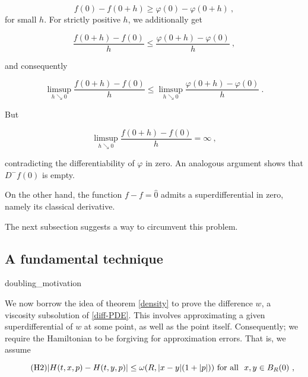 		\begin{equation*}
			f(0) - f(0 + h) \geq \varphi(0) - \varphi(0 + h)  \ ,
		\end{equation*}
		for small $ h $. For strictly positive $ h $, we additionally get
		
		\begin{equation*}
			\frac{f( 0 + h) - f(0)}{h} \leq \frac{\varphi(0 + h) - \varphi(0)}{h} \ ,
		\end{equation*}
		
		and consequently 
		
		\begin{equation*}
			\limsup\limits_{h \searrow 0} \frac{f( 0 + h) - f(0)}{h} \leq \limsup\limits_{h \searrow 0} \frac{\varphi(0 + h) - \varphi(0)}{h} \ .
		\end{equation*}
		
		But 
		
		\begin{equation*}
			\limsup\limits_{h \searrow 0} \frac{f( 0 + h) - f(0)}{h} = \infty \ ,
		\end{equation*}
		
		contradicting the differentiability of $ \varphi $ in zero. An analogous argument shows that $ D^{-}f(0) $ is empty.
		
		On the other hand, the function $ f - f = \hat{0} $ admits a superdifferential in zero, namely its classical derivative.
		
		The next subsection suggests a way to circumvent this problem.
		
	\subsection{A fundamental technique}
	
		 {doubling_motivation}
		 
		 We now borrow the idea of theorem \ref{density} to prove the difference $ w $, a viscosity subsolution of \eqref{diff-PDE}. This involves approximating a given superdifferential of $ w $ at some point, as well as the point itself. Consequently; we require the Hamiltonian to be forgiving for approximation errors. That is, we assume
		 
		 \begin{equation}
		 \tag{H2}
		 \lvert H(t, x, p) - H(t, y, p) \rvert \leq \omega(R, \lvert x - y \rvert (1 + \lvert p \rvert)) \hbox{ for all } \ x, y \in B_R(0) \ ,
		 \label{eqn:H2}
		 \end{equation}
		 
